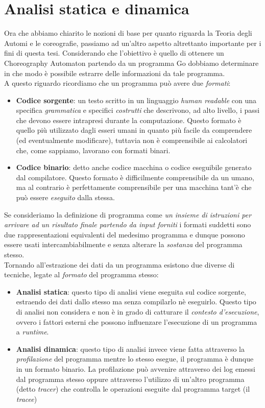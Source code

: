 \section{Analisi statica e dinamica}
Ora che abbiamo chiarito le nozioni di base per quanto riguarda la Teoria degli Automi e le coreografie, passiamo ad un'altro aspetto altrettanto importante per i fini di questa tesi. Considerando che l'obiettivo è quello di ottenere un Choreography Automaton partendo da un programma Go dobbiamo determinare in che modo è possibile estrarre delle informazioni da tale programma.\\
A questo riguardo ricordiamo che un programma può avere due \emph{formati}:
\begin{itemize}
    \item \textbf{Codice sorgente}: un testo scritto in un linguaggio \emph{human readable} con una specifica \emph{grammatica} e specifici \emph{costrutti} che descrivono, ad alto livello, i passi che devono essere intrapresi durante la computazione. Questo formato è quello più utilizzato dagli esseri umani in quanto più facile da comprendere (ed eventualmente modificare), tuttavia non è comprensibile ai calcolatori che, come sappiamo, lavorano con formati binari.
    \item \textbf{Codice binario}: detto anche codice macchina o codice eseguibile generato dal compilatore. Questo formato è difficilmente comprensibile da un umano, ma al contrario è perfettamente comprensibile per una macchina tant'è che può essere \emph{eseguito} dalla stessa.
\end{itemize}
Se consideriamo la definizione di programma come \emph{un insieme di istruzioni per arrivare ad un risultato finale partendo da input forniti} i formati suddetti sono due rappresentazioni equivalenti del medesimo programma e dunque possono essere usati intercambiabilmente e senza alterare la \emph{sostanza} del programma stesso. \bigskip \\
Tornando all'estrazione dei dati da un programma esistono due diverse di tecniche, legate al \emph{formato} del programma stesso:
\begin{itemize}
    \item \textbf{Analisi statica}\cite{Static_Analysis}: questo tipo di analisi viene eseguita sul codice sorgente, estraendo dei dati dallo stesso ma senza compilarlo nè eseguirlo. Questo tipo di analisi non considera e non è in grado di catturare il \emph{contesto d'esecuzione}, ovvero i fattori esterni che possono influenzare l'esecuzione di un programma a \emph{runtime}.
    \item \textbf{Analisi dinamica}\cite{Dynamic_Analysis}: questo tipo di analisi invece viene fatta attraverso la \emph{profilazione} del programma mentre lo stesso esegue, il programma è dunque in un formato binario. La profilazione può avvenire attraverso dei log emessi dal programma stesso oppure attraverso l'utilizzo di un'altro programma (detto \emph{tracer}) che controlla le operazioni eseguite dal programma target (il \emph{tracee})
\end{itemize}

